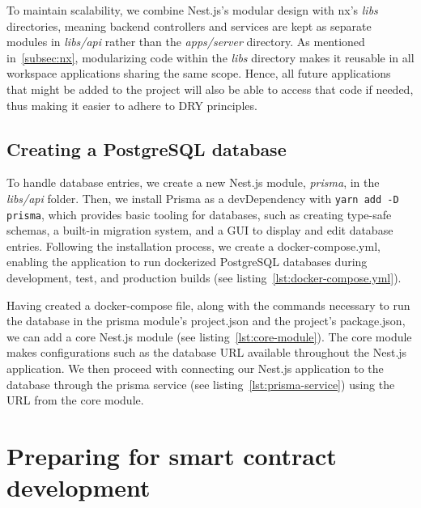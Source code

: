 To maintain scalability, we combine Nest.js's modular design with nx's \emph{libs} directories, meaning backend controllers and services are kept as separate modules in \emph{libs/api} rather than the \emph{apps/server} directory.
As mentioned in~\cref{subsec:nx}, modularizing code within the \emph{libs} directory makes it reusable in all workspace applications sharing the same scope.
Hence, all future applications that might be added to the project will also be able to access that code if needed, thus making it easier to adhere to \gls{DRY} principles.

\subsection{Creating a PostgreSQL database}\label{subsec:creating-a-postgresql-database}

To handle database entries, we create a new Nest.js module, \emph{prisma}, in the \emph{libs/api} folder.
Then, we install Prisma as a devDependency with \texttt{yarn add -D prisma}, which provides basic tooling for databases, such as creating type-safe schemas, a built-in migration system, and a \gls{GUI} to display and edit database entries.
Following the installation process, we create a docker-compose.yml, enabling the application to run dockerized PostgreSQL databases during development, test, and production builds (see listing~\ref{lst:docker-compose.yml}).


Having created a docker-compose file, along with the commands necessary to run the database in the prisma module’s project.json and the project’s package.json, we can add a core Nest.js module (see listing~\ref{lst:core-module}).
The core module makes configurations such as the database \gls{URL} available throughout the Nest.js application.
We then proceed with connecting our Nest.js application to the database through the prisma service (see listing~\ref{lst:prisma-service}) using the \gls{URL} from the core module.


\section{Preparing for smart contract development}\label{sec:preparing-for-smart-contract-development}

